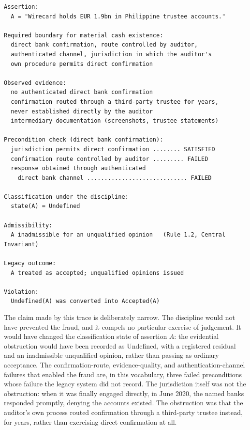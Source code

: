 \documentclass[smallcondensed,envcountsect,natbib]{svjour3}
\newcommand{\state}[1]{\textsf{#1}}
\begin{document}
\begin{lstlisting}
Assertion:
  A = "Wirecard holds EUR 1.9bn in Philippine trustee accounts."

Required boundary for material cash existence:
  direct bank confirmation, route controlled by auditor,
  authenticated channel, jurisdiction in which the auditor's
  own procedure permits direct confirmation

Observed evidence:
  no authenticated direct bank confirmation
  confirmation routed through a third-party trustee for years,
  never established directly by the auditor
  intermediary documentation (screenshots, trustee statements)

Precondition check (direct bank confirmation):
  jurisdiction permits direct confirmation ........ SATISFIED
  confirmation route controlled by auditor ......... FAILED
  response obtained through authenticated
    direct bank channel ............................. FAILED

Classification under the discipline:
  state(A) = Undefined

Admissibility:
  A inadmissible for an unqualified opinion   (Rule 1.2, Central Invariant)

Legacy outcome:
  A treated as accepted; unqualified opinions issued

Violation:
  Undefined(A) was converted into Accepted(A)
\end{lstlisting}

The claim made by this trace is deliberately narrow. The discipline would not have prevented the fraud, and it compels no particular exercise of judgement. It would have changed the classification state of assertion $A$: the evidential obstruction would have been recorded as \state{Undefined}, with a registered residual and an inadmissible unqualified opinion, rather than passing as ordinary acceptance. The confirmation-route, evidence-quality, and authentication-channel failures that enabled the fraud are, in this vocabulary, three failed preconditions whose failure the legacy system did not record. The jurisdiction itself was not the obstruction: when it was finally engaged directly, in June 2020, the named banks responded promptly, denying the accounts existed. The obstruction was that the auditor's own process routed confirmation through a third-party trustee instead, for years, rather than exercising direct confirmation at all.
\end{document}
